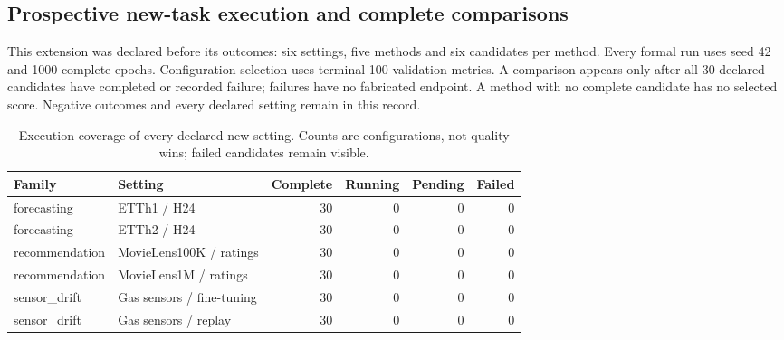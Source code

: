 \subsection{Prospective new-task execution and complete comparisons}\label{app:new-family-results}
This extension was declared before its outcomes: six settings, five methods and six candidates per method. Every formal run uses seed 42 and 1000 complete epochs. Configuration selection uses terminal-100 validation metrics. A comparison appears only after all 30 declared candidates have completed or recorded failure; failures have no fabricated endpoint. A method with no complete candidate has no selected score. Negative outcomes and every declared setting remain in this record.
\begin{table}[htbp]\centering\footnotesize\setlength{\tabcolsep}{3pt}\caption{Execution coverage of every declared new setting. Counts are configurations, not quality wins; failed candidates remain visible.}\begin{adjustbox}{max width=\linewidth}
\begin{tabular}{llrrrr}\toprule Family & Setting & Complete & Running & Pending & Failed\\\midrule
forecasting & ETTh1 / H24 & 30 & 0 & 0 & 0 \\
forecasting & ETTh2 / H24 & 30 & 0 & 0 & 0 \\
recommendation & MovieLens100K / ratings & 30 & 0 & 0 & 0 \\
recommendation & MovieLens1M / ratings & 30 & 0 & 0 & 0 \\
sensor\_drift & Gas sensors / fine-tuning & 30 & 0 & 0 & 0 \\
sensor\_drift & Gas sensors / replay & 30 & 0 & 0 & 0 \\
\bottomrule\end{tabular}
\end{adjustbox}\end{table}
\FloatBarrier
